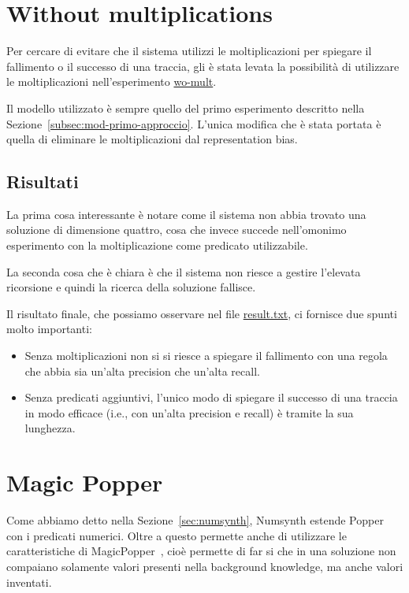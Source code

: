 \section{Without multiplications}
\label{sec:wo-mult}
Per cercare di evitare che il sistema utilizzi le moltiplicazioni per spiegare il fallimento o il successo di una traccia, gli è stata levata la possibilità di utilizzare le moltiplicazioni nell'esperimento \href{https://github.com/edoardosarri24/numsynth/tree/main/my-experiments/4-wo-mult/}{wo-mult}.

Il modello utilizzato è sempre quello del primo esperimento descritto nella Sezione~\ref{subsec:mod-primo-approccio}. L'unica modifica che è stata portata è quella di eliminare le moltiplicazioni dal representation bias.

\subsection{Risultati}
La prima cosa interessante è notare come il sistema non abbia trovato una soluzione di dimensione quattro, cosa che invece succede nell'omonimo esperimento con la moltiplicazione come predicato utilizzabile.

La seconda cosa che è chiara è che il sistema non riesce a gestire l'elevata ricorsione e quindi la ricerca della soluzione fallisce.

\myskip

Il risultato finale, che possiamo osservare nel file \href{https://github.com/edoardosarri24/numsynth/tree/main/my-experiments/4-wo-mult/result.txt}{result.txt}, ci fornisce due spunti molto importanti:
\begin{itemize}
    \item Senza moltiplicazioni non si si riesce a spiegare il fallimento con una regola che abbia sia un'alta precision che un'alta recall.
    \item Senza predicati aggiuntivi, l'unico modo di spiegare il successo di una traccia in modo efficace (i.e., con un'alta precision e recall) è tramite la sua lunghezza.
\end{itemize}

\section{Magic Popper}
\label{sec:magic-popper}
Come abbiamo detto nella Sezione~\ref{sec:numsynth}, Numsynth estende Popper con i predicati numerici. Oltre a questo permette anche di utilizzare le caratteristiche di MagicPopper~\cite{hocquette2023learning}, cioè permette di far si che in una soluzione non compaiano solamente valori presenti nella background knowledge, ma anche valori inventati.

